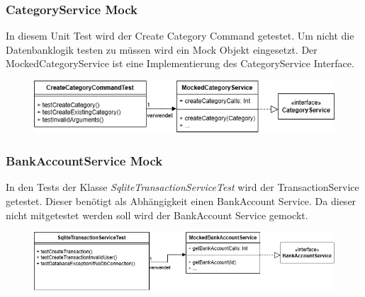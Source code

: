 \subsubsection*{CategoryService Mock}

In diesem Unit Test wird der Create Category Command getestet. Um nicht die Datenbanklogik testen zu müssen wird ein Mock Objekt eingesetzt. Der MockedCategoryService ist eine Implementierung des CategoryService Interface.  

\begin{figure}[htbp]
    \centering
    \includegraphics[width=\linewidth]{kapitel5_unit_tests/mock1.drawio.png}
\end{figure}
\newpage
\subsubsection*{BankAccountService Mock}

In den Tests der Klasse \textit{SqliteTransactionServiceTest} wird der TransactionService getestet. Dieser benötigt als Abhängigkeit einen BankAccount Service. Da dieser nicht mitgetestet werden soll wird der BankAccount Service gemockt.
\begin{figure}[htbp]
    \centering
    \includegraphics[width=\linewidth]{kapitel5_unit_tests/mock2.drawio.png}
\end{figure}